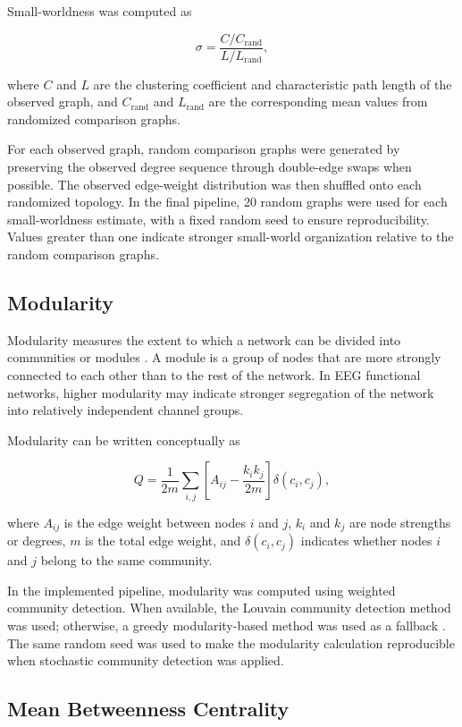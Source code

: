 Small-worldness was computed as

\[
    \sigma =
    \frac{C / C_{\mathrm{rand}}}{L / L_{\mathrm{rand}}},
\]

where $C$ and $L$ are the clustering coefficient and characteristic path length
of the observed graph, and $C_{\mathrm{rand}}$ and $L_{\mathrm{rand}}$ are the
corresponding mean values from randomized comparison graphs.

For each observed graph, random comparison graphs were generated by preserving
the observed degree sequence through double-edge swaps when possible. The
observed edge-weight distribution was then shuffled onto each randomized
topology. In the final pipeline, \num{20} random graphs were used for each
small-worldness estimate, with a fixed random seed to ensure reproducibility.
Values greater than one indicate stronger small-world organization relative to
the random comparison graphs.

\subsection{Modularity}
\label{subsec:modularity}

Modularity measures the extent to which a network can be divided into
communities or modules \cite{Newman2006,Rubinov2010}. A module is a group of nodes that are more strongly
connected to each other than to the rest of the network. In EEG functional
networks, higher modularity may indicate stronger segregation of the network
into relatively independent channel groups.

Modularity can be written conceptually as

\[
    Q =
    \frac{1}{2m}
    \sum_{i,j}
    \left[
    A_{ij}
    -
    \frac{k_i k_j}{2m}
    \right]
    \delta(c_i,c_j),
\]

where $A_{ij}$ is the edge weight between nodes $i$ and $j$, $k_i$ and $k_j$
are node strengths or degrees, $m$ is the total edge weight, and
$\delta(c_i,c_j)$ indicates whether nodes $i$ and $j$ belong to the same
community.

In the implemented pipeline, modularity was computed using weighted community
detection. When available, the Louvain community detection method was used;
otherwise, a greedy modularity-based method was used as a fallback \cite{Blondel2008}. The same
random seed was used to make the modularity calculation reproducible when
stochastic community detection was applied.

\subsection{Mean Betweenness Centrality}
\label{subsec:mean-betweenness-centrality}

